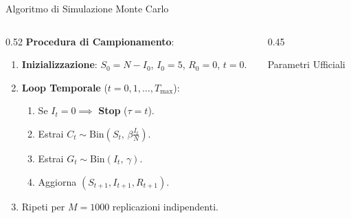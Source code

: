 \documentclass[10pt, aspectratio=169]{beamer}
\begin{document}
\begin{frame}{Algoritmo di Simulazione Monte Carlo}
    \begin{columns}[T]
        \begin{column}{0.52\textwidth}
            \textbf{Procedura di Campionamento}:
            \begin{enumerate}
                \item \textbf{Inizializzazione}: $S_0 = N - I_0$, $I_0 = 5$, $R_0 = 0$, $t = 0$.
                \item \textbf{Loop Temporale} ($t = 0, 1, \dots, T_{\max}$):
                \begin{enumerate}
                    \item Se $I_t = 0 \implies$ \textbf{Stop} ($\tau = t$).
                    \item Estrai $C_t \sim \text{Bin}(S_t,\, \beta \frac{I_t}{N})$.
                    \item Estrai $G_t \sim \text{Bin}(I_t,\, \gamma)$.
                    \item Aggiorna $(S_{t+1}, I_{t+1}, R_{t+1})$.
                \end{enumerate}
                \item Ripeti per $M = 1000$ replicazioni indipendenti.
            \end{enumerate}
        \end{column}
        \begin{column}{0.45\textwidth}
            \begin{block}{Parametri Ufficiali}
            \end{block}
        \end{column}
    \end{columns}


\end{frame}
\end{document}
